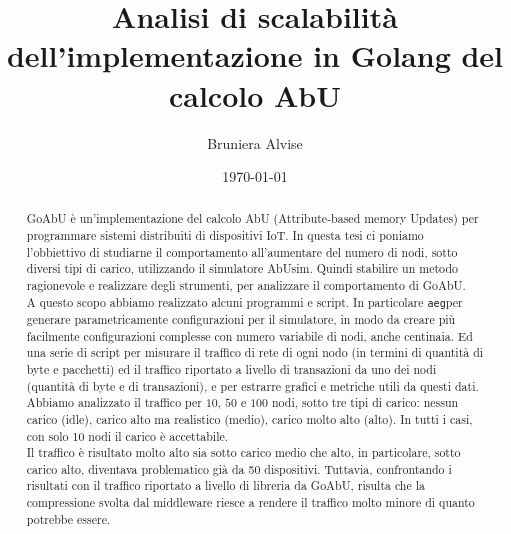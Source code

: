 \documentclass[12pt, a4paper]{article}
\title{Analisi di scalabilità dell'implementazione in Golang del calcolo AbU}
\author{Bruniera Alvise}
\affil{Università degli studi di Udine}
\date{\today}
\newcommand{\michele}[1]{{\color{red}Michele:~}{\itshape``{#1}''}}
\newcommand{\aeg}[0]{{\lstinline{aeg}}}
\begin{document}
\maketitle

\newpage
\begin{abstract}
    GoAbU è un'implementazione del calcolo AbU (Attribute-based memory Updates) per programmare sistemi distribuiti di dispositivi IoT. In questa tesi ci poniamo l'obbiettivo di studiarne il comportamento all'aumentare del numero di nodi, sotto diversi tipi di carico, utilizzando il simulatore AbUsim. Quindi stabilire un metodo ragionevole e realizzare degli strumenti, per analizzare il comportamento di GoAbU.\\
    A questo scopo abbiamo realizzato alcuni programmi e script. In particolare \aeg per generare parametricamente configurazioni per il simulatore, in modo da creare più facilmente configurazioni complesse con numero variabile di nodi, anche centinaia. Ed una serie di script per misurare il traffico di rete di ogni nodo (in termini di quantità di byte e pacchetti) ed il traffico riportato a livello di transazioni da uno dei nodi (quantità di byte e di transazioni), e per estrarre grafici e metriche utili da questi dati.\\
    Abbiamo analizzato il traffico per $10$, $50$ e $100$ nodi, sotto tre tipi di carico: nessun carico (idle), carico alto ma realistico (medio), carico molto alto (alto). In tutti i casi, con solo 10 nodi il carico è accettabile.\\
    Il traffico è risultato molto alto sia sotto carico medio che alto, in particolare, sotto carico alto, diventava problematico già da 50 dispositivi. Tuttavia, confrontando i risultati con il traffico riportato a livello di libreria da GoAbU, risulta che la compressione svolta dal middleware riesce a rendere il traffico molto minore di quanto potrebbe essere.

\end{abstract}
\end{document}
